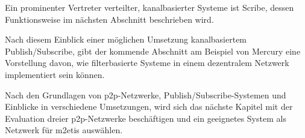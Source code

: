 Ein prominenter Vertreter verteilter, kanalbasierter Systeme ist Scribe, dessen Funktionsweise im nächsten Abschnitt beschrieben wird.



Nach diesem Einblick einer möglichen Umsetzung kanalbasiertem Publish/Subscribe, gibt der kommende Abschnitt am Beispiel von Mercury eine Vorstellung davon, wie filterbasierte Systeme in einem dezentralem Netzwerk implementiert sein können.





Nach den Grundlagen von \ac{p2p}-Netzwerke, Publish/Subscribe-Systemen und Einblicke in verschiedene Umsetzungen, wird sich das nächste Kapitel mit der Evaluation dreier \ac{p2p}-Netzwerke beschäftigen und ein geeignetes System als Netzwerk für \ac {m2etis} auswählen.
